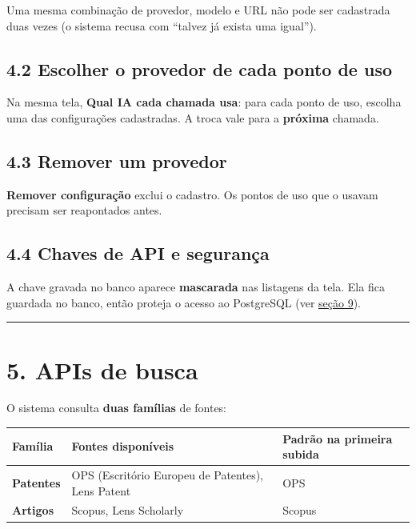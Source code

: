 \documentclass[
  brazilian,
  a4paper,12pt,oneside]{report}
\newcounter{none} %
\begin{document}
Uma mesma combinação de provedor, modelo e URL não pode ser cadastrada
duas vezes (o sistema recusa com ``talvez já exista uma igual'').

\section{4.2 Escolher o provedor de cada ponto de
uso}\label{escolher-o-provedor-de-cada-ponto-de-uso}

Na mesma tela, \textbf{Qual IA cada chamada usa}: para cada ponto de
uso, escolha uma das configurações cadastradas. A troca vale para a
\textbf{próxima} chamada.

\section{4.3 Remover um provedor}\label{remover-um-provedor}

\textbf{Remover configuração} exclui o cadastro. Os pontos de uso que o
usavam precisam ser reapontados antes.

\section{4.4 Chaves de API e
segurança}\label{chaves-de-api-e-seguranuxe7a}

A chave gravada no banco aparece \textbf{mascarada} nas listagens da
tela. Ela fica guardada no banco, então proteja o acesso ao PostgreSQL
(ver \hyperref[9-seguranuxe7a]{seção 9}).

\begin{center}\rule{0.5\linewidth}{0.5pt}\end{center}

\chapter{5. APIs de busca}\label{apis-de-busca}

O sistema consulta \textbf{duas famílias} de fontes:

{\def\LTcaptype{none} %
\begin{longtable}[]{@{}
  >{\raggedright\arraybackslash}p{}
  >{\raggedright\arraybackslash}p{}
  >{\raggedright\arraybackslash}p{}@{}}
\toprule\noalign{}
\begin{minipage}[b]{\linewidth}\raggedright
Família
\end{minipage} & \begin{minipage}[b]{\linewidth}\raggedright
Fontes disponíveis
\end{minipage} & \begin{minipage}[b]{\linewidth}\raggedright
Padrão na primeira subida
\end{minipage} \\
\midrule\noalign{}
\endhead
\bottomrule\noalign{}
\endlastfoot
\textbf{Patentes} & OPS (Escritório Europeu de Patentes), Lens Patent &
OPS \\
\textbf{Artigos} & Scopus, Lens Scholarly & Scopus \\
\end{longtable}
}
\end{document}
